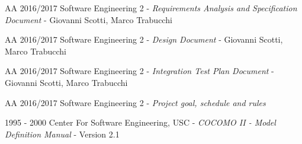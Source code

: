 \begin{thebibliography}{9}

	AA 2016/2017 Software Engineering 2 - \emph{Requirements Analysis and Specification Document} - Giovanni Scotti, Marco Trabucchi

	AA 2016/2017 Software Engineering 2 - \emph{Design Document} - Giovanni Scotti, Marco Trabucchi

	AA 2016/2017 Software Engineering 2 - \emph{Integration Test Plan Document} - Giovanni Scotti, Marco Trabucchi
	
	AA 2016/2017 Software Engineering 2 - \emph{Project goal, schedule and rules}
	
	1995 - 2000 Center For Software Engineering, USC - \emph{COCOMO II - Model Definition Manual} - Version 2.1

\end{thebibliography}